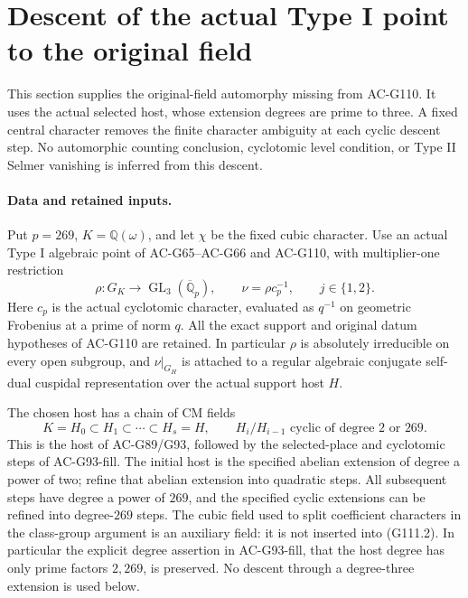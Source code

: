 \section{Descent of the actual Type I point to the original field}
\label{sec:cubic-original-field-descent}

This section supplies the original-field automorphy missing from
AC-G110. It uses the actual selected host, whose extension degrees
are prime to three. A fixed central character removes the finite
character ambiguity at each cyclic descent step. No automorphic
counting conclusion, cyclotomic level condition, or Type II
Selmer vanishing is inferred from this descent.

\paragraph{Data and retained inputs.}
Put \(p=269\), \(K=\mathbb Q(\omega)\), and let \(\chi\)
be the fixed cubic character. Use an actual Type I algebraic point
of AC-G65--AC-G66 and AC-G110, with multiplier-one restriction
\[
 \rho:G_K\longrightarrow\operatorname{GL}_3(\overline{\mathbb Q}_p),
 \qquad \nu=\rho c_p^{-1},\qquad j\in\{1,2\}.
 \tag{G111.1}
\]
Here \(c_p\) is the actual cyclotomic character, evaluated as
\(q^{-1}\) on geometric Frobenius at a prime of norm \(q\).
All the exact support and original datum hypotheses of AC-G110
are retained. In particular \(\rho\) is absolutely irreducible
on every open subgroup, and \(\nu|_{G_H}\) is attached to a
regular algebraic conjugate self-dual cuspidal representation
over the actual support host \(H\).

The chosen host has a chain of CM fields
\[
 K=H_0\subset H_1\subset\cdots\subset H_s=H,
 \qquad H_i/H_{i-1}\text{ cyclic of degree }2\text{ or }269.
 \tag{G111.2}
\]
This is the host of AC-G89/G93, followed by the selected-place
and cyclotomic steps of AC-G93-fill. The initial host is the
specified abelian extension of degree a power of two; refine
that abelian extension into quadratic steps. All subsequent
steps have degree a power of \(269\), and the specified cyclic
extensions can be refined into degree-\(269\) steps.
The cubic field used to split coefficient characters in the
class-group argument is an auxiliary field: it is not inserted
into (G111.2). In particular the explicit degree assertion in
AC-G93-fill, that the host degree has only prime factors
\(2,269\), is preserved. No descent through a degree-three
extension is used below.

